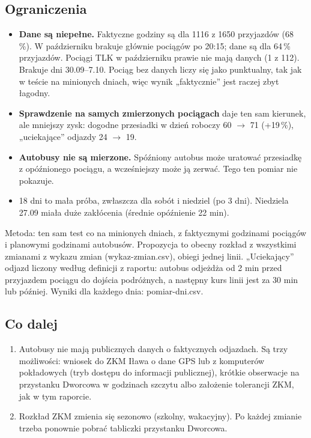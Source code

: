 \documentclass[10pt,a4paper]{article}
\newcommand{\mut}[1]{\textcolor{muted}{#1}}
\begin{document}
\subsection*{Ograniczenia}
\begin{itemize}
\item \textbf{Dane są niepełne.} Faktyczne godziny są dla 1116 z 1650 przyjazdów (68\,\%). W październiku brakuje głównie pociągów po 20:15; dane są dla 64\,\% przyjazdów. Pociągi TLK w październiku prawie nie mają danych (1 z 112). Brakuje dni 30.09--7.10. Pociąg bez danych liczy się jako punktualny, tak jak w teście na minionych dniach, więc wynik „faktycznie” jest raczej zbyt łagodny.
\item \textbf{Sprawdzenie na samych zmierzonych pociągach} daje ten sam kierunek, ale mniejszy zysk: dogodne przesiadki w dzień roboczy 60 $\to$ 71 (+19\,\%), „uciekające” odjazdy 24 $\to$ 19.
\item \textbf{Autobusy nie są mierzone.} Spóźniony autobus może uratować przesiadkę z opóźnionego pociągu, a wcześniejszy może ją zerwać. Tego ten pomiar nie pokazuje.
\item 18 dni to mała próba, zwłaszcza dla sobót i niedziel (po 3 dni). Niedziela 27.09 miała duże zakłócenia (średnie opóźnienie 22 min).
\end{itemize}
\mut{\footnotesize Metoda: ten sam test co na minionych dniach, z faktycznymi godzinami pociągów i planowymi godzinami autobusów. Propozycja to obecny rozkład z wszystkimi zmianami z wykazu zmian (wykaz-zmian.csv), obiegi jednej linii. „Uciekający” odjazd liczony według definicji z raportu: autobus odjeżdża od 2 min przed przyjazdem pociągu do dojścia podróżnych, a następny kurs linii jest za 30 min lub później. Wyniki dla każdego dnia: pomiar-dni.csv.}

\subsection*{Co dalej}
\begin{enumerate}
\item Autobusy nie mają publicznych danych o faktycznych odjazdach. Są trzy możliwości: wniosek do ZKM Iława o dane GPS lub z komputerów pokładowych (tryb dostępu do informacji publicznej), krótkie obserwacje na przystanku Dworcowa w godzinach szczytu albo założenie tolerancji ZKM, jak w tym raporcie.
\item Rozkład ZKM zmienia się sezonowo (szkolny, wakacyjny). Po każdej zmianie trzeba ponownie pobrać tabliczki przystanku Dworcowa.
\end{enumerate}
\end{document}
